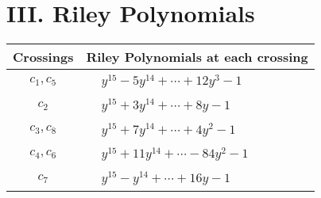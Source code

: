 \documentclass[1p]{elsarticle_modified}
\theoremstyle{definition}
\begin{document}
\centering \section*{ III. Riley Polynomials}
\begin{tabular}{m{50pt}|m{274pt}}
Crossings & \hspace{64pt}Riley Polynomials at each crossing \\
\hline $$\begin{aligned}c_{1},c_{5}\end{aligned}$$&$\begin{aligned}
&y^{15}-5 y^{14}+\cdots+12 y^3-1
\end{aligned}$\\
\hline $$\begin{aligned}c_{2}\end{aligned}$$&$\begin{aligned}
&y^{15}+3 y^{14}+\cdots+8 y-1
\end{aligned}$\\
\hline $$\begin{aligned}c_{3},c_{8}\end{aligned}$$&$\begin{aligned}
&y^{15}+7 y^{14}+\cdots+4 y^2-1
\end{aligned}$\\
\hline $$\begin{aligned}c_{4},c_{6}\end{aligned}$$&$\begin{aligned}
&y^{15}+11 y^{14}+\cdots-84 y^2-1
\end{aligned}$\\
\hline $$\begin{aligned}c_{7}\end{aligned}$$&$\begin{aligned}
&y^{15}- y^{14}+\cdots+16 y-1
\end{aligned}$\\
\hline
\end{tabular}
\vskip 2pc
\end{document}
